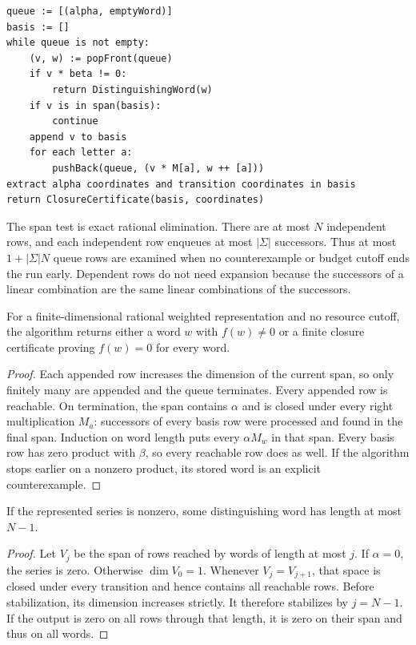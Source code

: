 \par\noindent\begin{minipage}{\linewidth}
\begin{lstlisting}
queue := [(alpha, emptyWord)]
basis := []
while queue is not empty:
    (v, w) := popFront(queue)
    if v * beta != 0:
        return DistinguishingWord(w)
    if v is in span(basis):
        continue
    append v to basis
    for each letter a:
        pushBack(queue, (v * M[a], w ++ [a]))
extract alpha coordinates and transition coordinates in basis
return ClosureCertificate(basis, coordinates)
\end{lstlisting}
\end{minipage}\par

The span test is exact rational elimination. There are at most $N$ independent
rows, and each independent row enqueues at most $|\Sigma|$ successors. Thus at
most $1+|\Sigma|N$ queue rows are examined when no counterexample or budget
cutoff ends the run early. Dependent rows do not need expansion because the
successors of a linear combination are the same linear combinations of the
successors.

\begin{theorem}
For a finite-dimensional rational weighted representation and no resource
cutoff, the algorithm returns either a word $w$ with $f(w)\ne0$ or a finite
closure certificate proving $f(w)=0$ for every word.
\end{theorem}
\begin{proof}
Each appended row increases the dimension of the current span, so only finitely
many are appended and the queue terminates. Every appended row is reachable.
On termination, the span contains $\alpha$ and is closed under every right
multiplication $M_a$: successors of every basis row were processed and found in
the final span. Induction on word length puts every $\alpha M_w$ in that span.
Every basis row has zero product with $\beta$, so every reachable row does as
well. If the algorithm stops earlier on a nonzero product, its stored word is
an explicit counterexample.
\end{proof}

\begin{proposition}
If the represented series is nonzero, some distinguishing word has length at
most $N-1$.
\end{proposition}
\begin{proof}
Let $V_j$ be the span of rows reached by words of length at most $j$. If
$\alpha=0$, the series is zero. Otherwise $\dim V_0=1$. Whenever
$V_j=V_{j+1}$, that space is closed under every transition and hence contains all
reachable rows. Before stabilization, its dimension increases strictly. It
therefore stabilizes by $j=N-1$. If the output is zero on all rows through that
length, it is zero on their span and thus on all words.
\end{proof}

